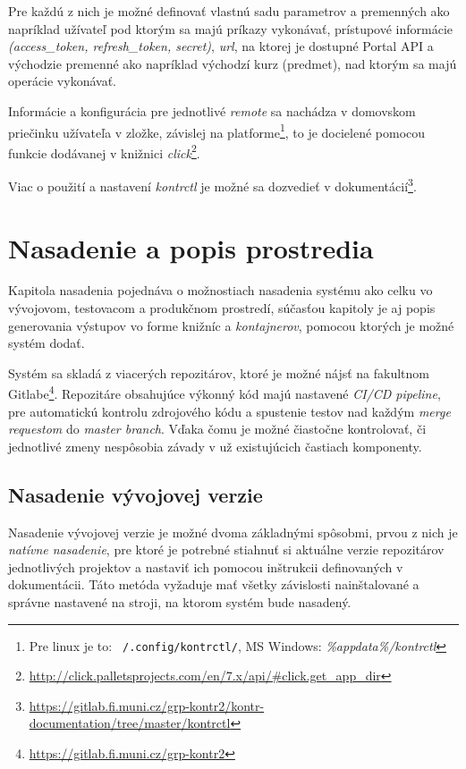 \documentclass[
  digital, %
  twoside, %
  table,   %
  lof,     %
  lot,     %
]{fithesis3}
\begin{document}
Pre každú z nich je možné definovať vlastnú sadu parametrov a premenných ako napríklad užívateľ pod ktorým sa majú príkazy vykonávať, prístupové informácie \emph{(access\_token, refresh\_token, secret)}, \emph{url}, na ktorej je dostupné Portal API a východzie premenné ako napríklad východzí kurz (predmet), nad ktorým sa majú operácie vykonávať.

Informácie a konfigurácia pre jednotlivé \emph{remote} sa nachádza v domovskom priečinku užívateľa v zložke, závislej na platforme\footnote{Pre linux je to: \texttt{~/.config/kontrctl/}, MS Windows: \emph{\%appdata\%/kontrctl}}, to je docielené pomocou funkcie dodávanej v knižnici \emph{click}\footnote{\url{http://click.palletsprojects.com/en/7.x/api/#click.get_app_dir}}.

Viac o použití a nastavení \emph{kontrctl} je možné sa dozvedieť v dokumentácií\footnote{\url{https://gitlab.fi.muni.cz/grp-kontr2/kontr-documentation/tree/master/kontrctl}}.

\chapter{Nasadenie a popis prostredia}

Kapitola nasadenia pojednáva o možnostiach nasadenia systému ako celku vo vývojovom, testovacom a produkčnom prostredí, súčasťou kapitoly je aj popis generovania výstupov vo forme knižníc a \emph{kontajnerov}, pomocou ktorých je možné systém dodať.

Systém sa skladá z viacerých repozitárov, ktoré je možné nájsť na fakultnom Gitlabe\footnote{\url{https://gitlab.fi.muni.cz/grp-kontr2}}. Repozitáre obsahujúce výkonný kód majú nastavené \emph{CI/CD pipeline}, pre automatickú kontrolu zdrojového kódu a spustenie testov nad každým \emph{merge requestom} do \emph{master branch}. Vďaka čomu je možné čiastočne kontrolovať, či jednotlivé zmeny nespôsobia závady v už existujúcich častiach komponenty.

\section{Nasadenie vývojovej verzie}

Nasadenie vývojovej verzie je možné dvoma základnými spôsobmi, prvou z nich je \emph{natívne nasadenie}, pre ktoré je potrebné stiahnuť si aktuálne verzie repozitárov jednotlivých projektov a nastaviť ich pomocou inštrukcii definovaných v dokumentácii. Táto metóda vyžaduje mať všetky závislosti nainštalované a správne nastavené na stroji, na ktorom systém bude nasadený.
\end{document}
